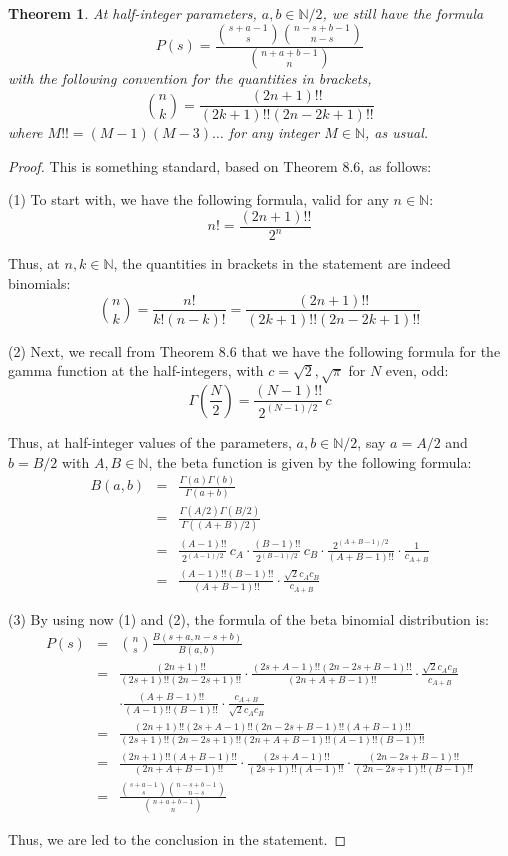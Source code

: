 \documentclass[12pt]{amsbook}
\newtheorem{theorem}{Theorem}[chapter]
\begin{document}
\begin{theorem}
At half-integer parameters, $a,b\in\mathbb N/2$, we still have the formula
$$P(s)=\frac{\binom{s+a-1}{s}\binom{n-s+b-1}{n-s}}{\binom{n+a+b-1}{n}}$$
with the following convention for the quantities in brackets,
$$\binom{n}{k}=\frac{(2n+1)!!}{(2k+1)!!(2n-2k+1)!!}$$
where $M!!=(M-1)(M-3)\ldots$ for any integer $M\in\mathbb N$, as usual.
\end{theorem}

\begin{proof}
This is something standard, based on Theorem 8.6, as follows:

\medskip

(1) To start with, we have the following formula, valid for any $n\in\mathbb N$:
$$n!=\frac{(2n+1)!!}{2^n}$$

Thus, at $n,k\in\mathbb N$, the quantities in brackets in the statement are indeed binomials:
$$\binom{n}{k}=\frac{n!}{k!(n-k)!}=\frac{(2n+1)!!}{(2k+1)!!(2n-2k+1)!!}$$

(2) Next, we recall from Theorem 8.6 that we have the following formula for the gamma function at the half-integers, with $c=\sqrt{2},\sqrt{\pi}$ for $N$ even, odd:
$$\Gamma\left(\frac{N}{2}\right)=\frac{(N-1)!!}{2^{(N-1)/2}}\,c$$

Thus, at half-integer values of the parameters, $a,b\in\mathbb N/2$, say $a=A/2$ and $b=B/2$ with $A,B\in\mathbb N$, the beta function is given by the following formula:
\begin{eqnarray*}
B(a,b)
&=&\frac{\Gamma(a)\Gamma(b)}{\Gamma(a+b)}\\
&=&\frac{\Gamma(A/2)\Gamma(B/2)}{\Gamma((A+B)/2)}\\
&=&\frac{(A-1)!!}{2^{(A-1)/2}}\,c_A\cdot\frac{(B-1)!!}{2^{(B-1)/2}}\,c_B
\cdot\frac{2^{(A+B-1)/2}}{(A+B-1)!!}\cdot\frac{1}{c_{A+B}}\\
&=&\frac{(A-1)!!(B-1)!!}{(A+B-1)!!}\cdot\frac{\sqrt{2}c_Ac_B}{c_{A+B}}
\end{eqnarray*}

(3) By using now (1) and (2), the formula of the beta binomial distribution is:
\begin{eqnarray*}
P(s)
&=&\binom{n}{s}\frac{B(s+a,n-s+b)}{B(a,b)}\\
&=&\frac{(2n+1)!!}{(2s+1)!!(2n-2s+1)!!}\cdot\frac{(2s+A-1)!!(2n-2s+B-1)!!}{(2n+A+B-1)!!}\cdot\frac{\sqrt{2}c_Ac_B}{c_{A+B}}\\
&&\cdot\frac{(A+B-1)!!}{(A-1)!!(B-1)!!}\cdot\frac{c_{A+B}}{\sqrt{2}c_Ac_B}\\
&=&\frac{(2n+1)!!(2s+A-1)!!(2n-2s+B-1)!!(A+B-1)!!}
{(2s+1)!!(2n-2s+1)!!(2n+A+B-1)!!(A-1)!!(B-1)!!}\\
&=&\frac{(2n+1)!!(A+B-1)!!}{(2n+A+B-1)!!}\cdot\frac{(2s+A-1)!!}{(2s+1)!!(A-1)!!}\cdot\frac{(2n-2s+B-1)!!}{(2n-2s+1)!!(B-1)!!}\\
&=&\frac{\binom{s+a-1}{s}\binom{n-s+b-1}{n-s}}{\binom{n+a+b-1}{n}}
\end{eqnarray*}

Thus, we are led to the conclusion in the statement.
\end{proof}
\end{document}

